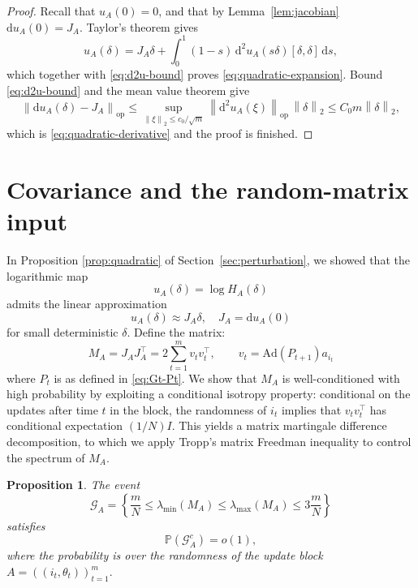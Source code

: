 \documentclass[11pt, reqno]{amsart}
\numberwithin{equation}{section}
\newtheorem{proposition}{Proposition}
\theoremstyle{remark}
\newcommand{\Prob}{\mathbb{P}}
\newcommand{\1}{\mathbf{1}}
\newcommand{\op}{\mathrm{op}}
\newcommand{\Ad}{\mathrm{Ad}}
\newcommand{\dd}{\mathrm{d}}
\newcommand{\norm}[1]{\left\lVert #1\right\rVert}
\begin{document}
\begin{proof}
Recall that $u_A(0)=0$, and that by Lemma~\ref{lem:jacobian}  $\dd u_A(0) = J_A$.
Taylor's theorem gives
\[
u_A(\delta)=J_A\delta+\int_0^1 (1-s)\,\dd^2u_A(s\delta)[\delta,\delta]\,\dd s,
\]
which together with \eqref{eq:d2u-bound} proves \eqref{eq:quadratic-expansion}.
Bound \eqref{eq:d2u-bound} and the mean value theorem give
\[
\norm{\dd u_A(\delta)-J_A}_{\op}
\le
\sup_{\norm{\xi}_2\le c_0/\sqrt m}\norm{\dd^2u_A(\xi)}_{\op}\,\norm{\delta}_2
\le C_0 m\norm{\delta}_2,
\]
which is \eqref{eq:quadratic-derivative} and the proof is finished.
\end{proof}

\section{Covariance and the random-matrix input}
\label{sec:covariance}

In Proposition \ref{prop:quadratic} of Section~\ref{sec:perturbation}, we showed that the logarithmic map
\[
u_A(\delta)=\log H_A(\delta)
\]
admits the linear approximation 
\[
u_A(\delta) \approx J_A\delta, \quad J_A=\dd u_A(0)
\] for small deterministic $\delta$.  Define the matrix:
\begin{equation}\label{eqn:MA}
M_A=J_AJ_A^\top=2\sum_{t=1}^m v_t v_t^\top,
\qquad v_t=\Ad(P_{t+1})a_{i_t}
\end{equation}
where $P_t$ is as defined in \eqref{eq:Gt-Pt}.
We show that $M_A$ is well-conditioned with high probability by exploiting a conditional isotropy property: conditional on the updates after time $t$ in the block, the randomness of $i_t$ implies that $v_t v_t^\top$ has conditional expectation $(1/N)I$. This yields a matrix martingale difference decomposition, to which we apply Tropp's matrix Freedman inequality \cite[Theorem~1.2]{Tropp} to control the spectrum of $M_A$.

\begin{proposition}
\label{prop:covariance}
The event
\begin{equation} \label{eq:good-event}
\mathcal G_A
=
\left\{
\frac{m}{N}\le \lambda_{\min}(M_A)\le \lambda_{\max}(M_A)\le 3\frac{m}{N}
\right\}
\end{equation}
satisfies
\[
\Prob(\mathcal G_A^c)=o(1),
\]
where the probability is over the randomness of the update block
$
A=((i_t,\theta_t))_{t=1}^m.
$
\end{proposition}
\end{document}
